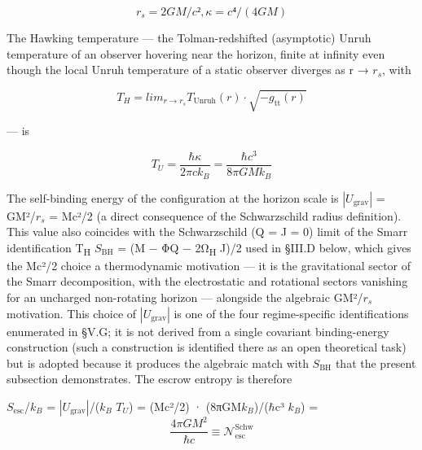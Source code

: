 \documentclass[11pt]{article}
\begin{document}
\[ r_s = 2GM/c², κ = c⁴/(4GM) \]

The Hawking temperature --- the Tolman-redshifted (asymptotic) Unruh
temperature of an observer hovering near the horizon, finite at infinity
even though the local Unruh temperature of a static observer diverges as
r → $r_{s}$, with

\[ T_H = lim_{r\to r_s} T_{\mathrm{Unruh}}(r) \cdot  \sqrt{-g_{\mathrm{tt}}(r)} \]

--- is

\begin{equation}
  T_{U} = \frac{\hbar \kappa}{2\pi c k_{B}} = \frac{\hbar c^{3}}{8\pi G M k_{B}}
  \label{eq:16}
\end{equation}

The self-binding energy of the configuration at the horizon scale is
$|U_{\mathrm{grav}}|$ = GM²/$r_{s}$ = Mc²/2 (a direct consequence of the Schwarzschild
radius definition). This value also coincides with the Schwarzschild (Q
= J = 0) limit of the Smarr identification T\textsubscript{H} $S_{\mathrm{BH}}$ = (M − ΦQ − 2Ω\textsubscript{H}
J)/2 used in §III.D below, which gives the Mc²/2 choice a thermodynamic
motivation --- it is the gravitational sector of the Smarr
decomposition, with the electrostatic and rotational sectors vanishing
for an uncharged non-rotating horizon --- alongside the algebraic
GM²/$r_{s}$ motivation. This choice of $|U_{\mathrm{grav}}|$ is one of the four
regime-specific identifications enumerated in §V.G; it is not derived
from a single covariant binding-energy construction (such a construction
is identified there as an open theoretical task) but is adopted because
it produces the algebraic match with $S_{\mathrm{BH}}$ that the present subsection
demonstrates. The escrow entropy is therefore

$S_{\mathrm{esc}}$/$k_{B}$ = $|U_{\mathrm{grav}}|$/($k_{B}$ $T_{U}$) = (Mc²/2) · (8πGM$k_{B}$)/($\hbar$c³ $k_{B}$) =
\begin{equation}
  \frac{4\pi G M^{2}}{\hbar c} \equiv \mathcal{N}_{\mathrm{esc}}^{\mathrm{Schw}}
  \label{eq:17}
\end{equation}
\end{document}
